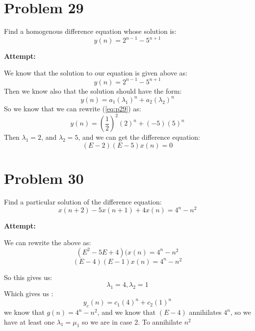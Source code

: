 \documentclass[12pt,letterpaper]{article}
\theoremstyle{definition}
\begin{document}
\newpage

%

\section*{Problem 29}

Find a homogenous difference equation whose solution is:
\begin{equation*}
    y(n) = 2^{n-1}-5^{n+1}
\end{equation*}


\textbf{Attempt:}

\begin{changemargin}{.5cm}{0cm}
    We know that the solution to our equation is given above as:
    \begin{equation}\label{eq:p29}
       y(n) = 2^{n-1}-5^{n+1}
    \end{equation}
    Then we know also that the solution should have the form:
    \begin{equation*}
        y(n) = a_1(\lambda_1)^n+a_2(\lambda_2)^n 
    \end{equation*}
    So we know that we can rewrite (\ref{eq:p29}) as:
    \begin{equation*}
        y(n)=\left(\dfrac{1}{2}\right)^2(2)^n + (-5)(5)^n
    \end{equation*}
    Then $\lambda_1 = 2$, and $\lambda_2 = 5$, and we can get the difference equation:
    \begin{equation*}
        (E-2)(E-5)x(n)=0
    \end{equation*}
\end{changemargin}

\newpage

\section*{Problem 30}

Find a particular solution of the difference equation:
\begin{equation*}
    x(n+2)-5x(n+1)+4x(n)=4^n-n^2
\end{equation*}


    
  \textbf{Attempt:}
    \begin{changemargin}{.5cm}{0cm}
    
    We can rewrite the above as:
    \begin{equation*}
        (E^2-5E+4)(x(n)=4^n-n^2
    \end{equation*}
    \begin{equation*}
        (E-4)(E-1)x(n)=4^n-n^2
    \end{equation*}
    
    So this gives us:
    \begin{equation*}
        \lambda_1=4,\lambda_2=1
    \end{equation*}
    Which gives us :
    \begin{equation*}
    y_c(n)=c_1(4)^n + c_2(1)^n    
    \end{equation*}
    we know that $g(n) = 4^n - n^2$, and we know that $(E-4)$ annihilates $4^n$, so we have at least one $\lambda_1 = \mu_1$ so we are in case 2. To annihilate $n^2$
    \end{changemargin}
\end{document}
